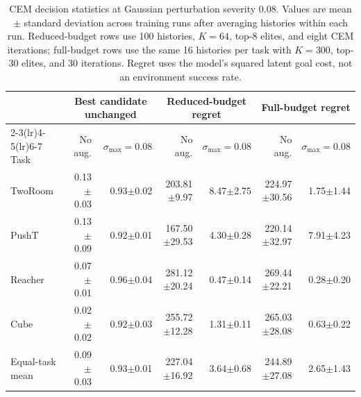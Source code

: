 \begin{table}[H]
\centering
\caption{CEM decision statistics at Gaussian perturbation severity 0.08. Values are mean $\pm$ standard deviation across training runs after averaging histories within each run. Reduced-budget rows use 100 histories, $K=64$, top-8 elites, and eight CEM iterations; full-budget rows use the same 16 histories per task with $K=300$, top-30 elites, and 30 iterations. Regret uses the model's squared latent goal cost, not an environment success rate.}
\label{tab:acpc-planner-absolute}
\scriptsize
\setlength{\tabcolsep}{2.2pt}
\begin{tabular}{lrrrrrr}
\toprule
& \multicolumn{2}{c}{Best candidate unchanged} & \multicolumn{2}{c}{Reduced-budget regret} & \multicolumn{2}{c}{Full-budget regret} \\
\cmidrule(lr){2-3}\cmidrule(lr){4-5}\cmidrule(lr){6-7}
Task & No aug. & $\sigma_{\max}{=}0.08$ & No aug. & $\sigma_{\max}{=}0.08$ & No aug. & $\sigma_{\max}{=}0.08$ \\
\midrule
TwoRoom & 0.13$\pm$0.03 & 0.93$\pm$0.02 & 203.81$\pm$9.97 & 8.47$\pm$2.75 & 224.97$\pm$30.56 & 1.75$\pm$1.44 \\
PushT & 0.13$\pm$0.09 & 0.92$\pm$0.01 & 167.50$\pm$29.53 & 4.30$\pm$0.28 & 220.14$\pm$32.97 & 7.91$\pm$4.23 \\
Reacher & 0.07$\pm$0.01 & 0.96$\pm$0.04 & 281.12$\pm$20.24 & 0.47$\pm$0.14 & 269.44$\pm$22.21 & 0.28$\pm$0.20 \\
Cube & 0.02$\pm$0.02 & 0.92$\pm$0.03 & 255.72$\pm$12.28 & 1.31$\pm$0.11 & 265.03$\pm$28.08 & 0.63$\pm$0.22 \\
\midrule
Equal-task mean & 0.09$\pm$0.03 & 0.93$\pm$0.01 & 227.04$\pm$16.92 & 3.64$\pm$0.68 & 244.89$\pm$27.08 & 2.65$\pm$1.43 \\
\bottomrule
\end{tabular}
\end{table}
